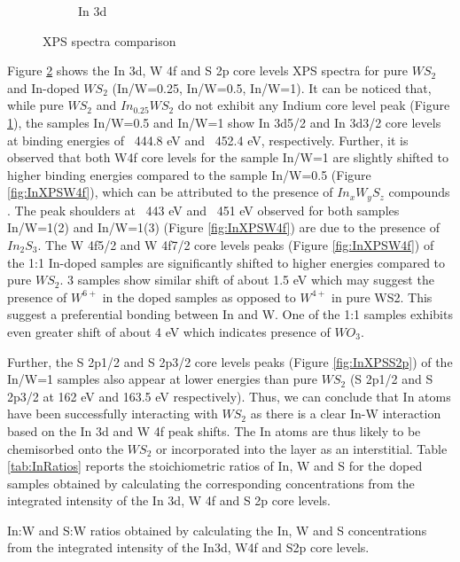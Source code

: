 \begin{figure}[!h]
\begin{center}
\begin{subfigure}[b]{1\textwidth}
			\caption{In 3d}
			\label{fig:InXPSIn3d}
		\end{subfigure}
		\caption{XPS spectra comparison}
		\label{fig:InXPSSpectra}
	\end{center}
\end{figure}

Figure \ref{fig:InXPSSpectra} shows the In 3d, W 4f and S 2p core levels XPS spectra for pure $WS_2$ and In-doped $WS_2$ (In/W=0.25, In/W=0.5, In/W=1). It can be noticed that, while pure $WS_2$ and $In_{0.25}WS_2$ do not exhibit any Indium core level peak (Figure \ref{fig:InXPSIn3d}), the samples In/W=0.5 and In/W=1 show In 3d5/2 and In 3d3/2 core levels at binding energies of ~444.8 eV and ~452.4 eV, respectively. Further, it is observed that both W4f core levels for the sample In/W=1 are slightly shifted to higher binding energies compared to the sample In/W=0.5 (Figure \ref{fig:InXPSW4f}), which can be attributed to the presence of $In_xW_yS_z$ compounds \cite{Wagner1991}. The peak shoulders at ~443 eV and ~451 eV observed for both samples In/W=1(2) and In/W=1(3) (Figure \ref{fig:InXPSW4f}) are due to the presence of $In_2S_3$. The W 4f5/2 and W 4f7/2 core levels peaks (Figure \ref{fig:InXPSW4f}) of the 1:1 In-doped samples are significantly shifted to higher energies compared to pure $WS_2$. 3 samples show similar shift of about 1.5 eV which may suggest the presence of $W^{6+}$ in the doped samples as opposed to $W^{4+}$ in pure WS2. This suggest a preferential bonding between In and W. One of the 1:1 samples exhibits even greater shift of about 4 eV which indicates presence of $WO_3$. 

Further, the S 2p1/2 and S 2p3/2 core levels peaks (Figure \ref{fig:InXPSS2p}) of the In/W=1 samples also appear at lower energies than pure $WS_2$ (S 2p1/2 and S 2p3/2 at 162 eV and 163.5 eV respectively). Thus, we can conclude that In atoms have been successfully interacting with $WS_2$ as there is a clear In-W interaction based on the In 3d and W 4f peak shifts. The In atoms are thus likely to be chemisorbed onto the $WS_2$ or incorporated into the layer as an interstitial. Table \ref{tab:InRatios} reports the stoichiometric ratios of In, W and S for the doped samples obtained by calculating the corresponding concentrations from the integrated intensity of the In 3d, W 4f and S 2p core levels. 

\begin{table}[!ht]
\caption{In:W and S:W ratios obtained by calculating the In, W and S concentrations from the integrated intensity of the In3d, W4f and S2p core levels.}
\label{tab:InRatios}
\end{table}

